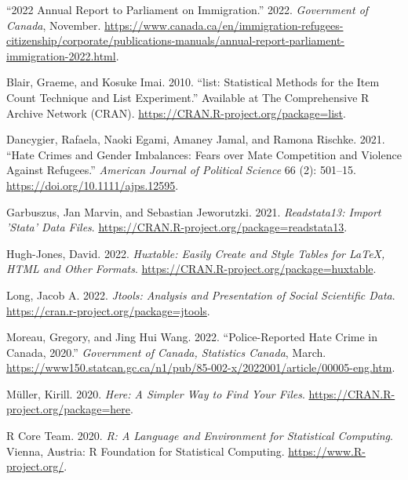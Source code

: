 \documentclass[
]{article}
\newlength{\cslhangindent}
\newlength{\cslentryspacingunit} %
\newenvironment{CSLReferences}[2] %
 {%
  \setlength{\parindent}{0pt}
  \ifodd #1
  \let\oldpar\par
  \def\par{\hangindent=\cslhangindent\oldpar}
  \fi
  \setlength{\parskip}{#2\cslentryspacingunit}
 }%
 {}
\begin{document}
\hypertarget{refs}{}
\begin{CSLReferences}{1}{0}
\leavevmode{}%
{``2022 Annual Report to Parliament on Immigration.''} 2022.
\emph{Government of Canada}, November.
\url{https://www.canada.ca/en/immigration-refugees-citizenship/corporate/publications-manuals/annual-report-parliament-immigration-2022.html}.

\leavevmode{}%
Blair, Graeme, and Kosuke Imai. 2010. {``{list}: Statistical Methods for
the Item Count Technique and List Experiment.''} Available at The
Comprehensive R Archive Network (CRAN).
\url{https://CRAN.R-project.org/package=list}.

\leavevmode{}%
Dancygier, Rafaela, Naoki Egami, Amaney Jamal, and Ramona Rischke. 2021.
{``Hate Crimes and Gender Imbalances: Fears over Mate Competition and
Violence Against Refugees.''} \emph{American Journal of Political
Science} 66 (2): 501--15. \url{https://doi.org/10.1111/ajps.12595}.

\leavevmode{}%
Garbuszus, Jan Marvin, and Sebastian Jeworutzki. 2021.
\emph{Readstata13: Import 'Stata' Data Files}.
\url{https://CRAN.R-project.org/package=readstata13}.

\leavevmode{}%
Hugh-Jones, David. 2022. \emph{Huxtable: Easily Create and Style Tables
for LaTeX, HTML and Other Formats}.
\url{https://CRAN.R-project.org/package=huxtable}.

\leavevmode{}%
Long, Jacob A. 2022. \emph{Jtools: Analysis and Presentation of Social
Scientific Data}. \url{https://cran.r-project.org/package=jtools}.

\leavevmode{}%
Moreau, Gregory, and Jing Hui Wang. 2022. {``Police-Reported Hate Crime
in Canada, 2020.''} \emph{Government of Canada, Statistics Canada},
March.
\url{https://www150.statcan.gc.ca/n1/pub/85-002-x/2022001/article/00005-eng.htm}.

\leavevmode{}%
Müller, Kirill. 2020. \emph{Here: A Simpler Way to Find Your Files}.
\url{https://CRAN.R-project.org/package=here}.

\leavevmode{}%
R Core Team. 2020. \emph{R: A Language and Environment for Statistical
Computing}. Vienna, Austria: R Foundation for Statistical Computing.
\url{https://www.R-project.org/}.


\end{CSLReferences}
\end{document}
